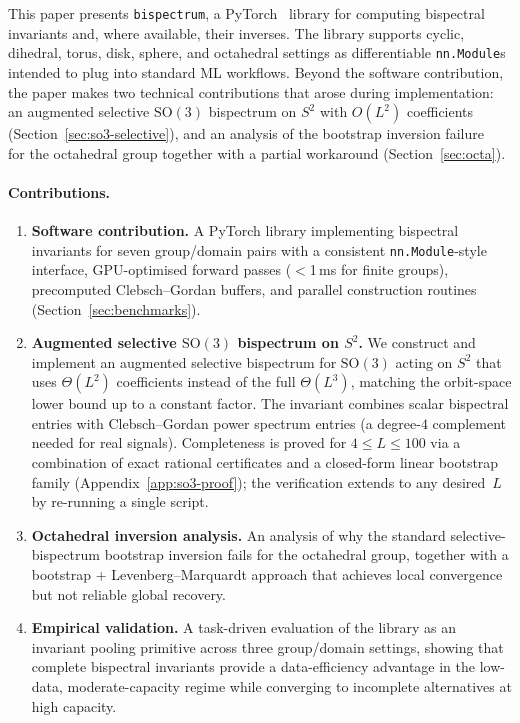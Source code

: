\documentclass{article}
\theoremstyle{definition}
\theoremstyle{remark}
\newcommand{\SO}{\mathrm{SO}}
\theoremstyle{definition}
\begin{document}
This paper presents \texttt{bispectrum}, a PyTorch~\citep{paszke2019pytorch}
library for computing bispectral invariants and, where available, their
inverses. The library
supports cyclic, dihedral, torus, disk, sphere, and octahedral settings as
differentiable \texttt{nn.Module}s intended to plug into standard ML workflows.
Beyond the software contribution, the paper makes two technical contributions
that arose during implementation: an augmented selective $\SO(3)$
bispectrum on $S^2$ with $O(L^2)$ coefficients
(Section~\ref{sec:so3-selective}), and an analysis of
the bootstrap inversion failure~\citep{mataigne2024selective} for the
octahedral group together with a partial workaround (Section~\ref{sec:octa}).

\paragraph{Contributions.}
\begin{enumerate}
  \item \textbf{Software contribution.} A PyTorch library implementing
    bispectral invariants for seven group/domain pairs with a consistent
    \texttt{nn.Module}-style interface, GPU-optimised forward passes
    ($<$1\,ms for finite groups), precomputed Clebsch--Gordan buffers,
    and parallel construction routines
    (Section~\ref{sec:benchmarks}).
  \item \textbf{Augmented selective $\SO(3)$ bispectrum on $S^2$.} We construct
    and implement an augmented selective bispectrum for $\SO(3)$ acting on
    $S^2$ that uses
    $\Theta(L^2)$ coefficients instead of the full $\Theta(L^3)$,
    matching the orbit-space lower bound up to a constant factor.
    The invariant combines scalar bispectral entries with
    Clebsch--Gordan power spectrum entries (a degree-$4$ complement
    needed for real signals).  Completeness is proved for $4 \le L \le 100$
    via a combination of exact rational certificates and a
    closed-form linear bootstrap family (Appendix~\ref{app:so3-proof});
    the verification extends to any desired~$L$ by re-running a single script.
  \item \textbf{Octahedral inversion analysis.} An analysis of why the standard
    selective-bispectrum bootstrap inversion fails for the octahedral group,
    together with a bootstrap + Levenberg--Marquardt approach that achieves
    local convergence but not reliable global recovery.
  \item \textbf{Empirical validation.} A task-driven evaluation of the
    library as an invariant pooling primitive across three group/domain
    settings, showing that complete bispectral invariants provide a
    data-efficiency advantage in the low-data, moderate-capacity regime
    while converging to incomplete alternatives at high capacity.
\end{enumerate}
\end{document}
